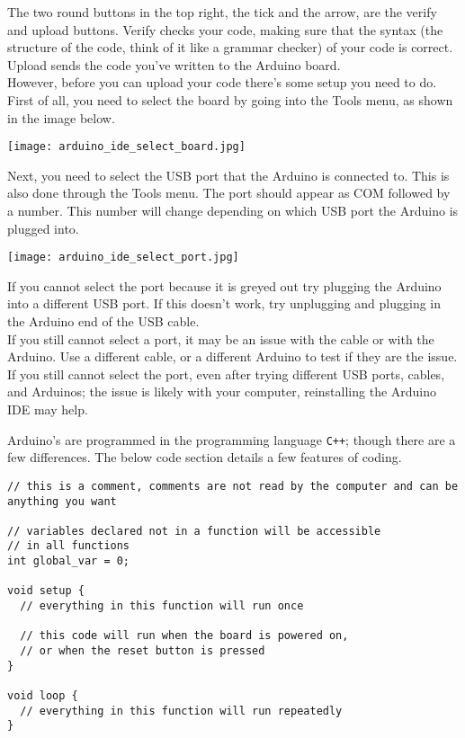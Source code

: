 \documentclass[../TinyBot.tex]{subfiles}
\begin{document}
The two round buttons in the top right, the tick and the arrow, are the verify and upload buttons. Verify checks your code, making sure that the syntax (the structure of the code, think of it like a grammar checker) of your code is correct. Upload sends the code you've written to the Arduino board.  \\

However, before you can upload your code there's some setup you need to do. First of all, you need to select the board by going into the Tools menu, as shown in the image below. 

\begin{center}
  \texttt{[image: arduino\_ide\_select\_board.jpg]}
\end{center}

Next, you need to select the USB port that the Arduino is connected to. This is also done through the Tools menu. The port should appear as COM followed by a number. This number will change depending on which USB port the Arduino is plugged into. 

\begin{center}
  \texttt{[image: arduino\_ide\_select\_port.jpg]}
\end{center}

\begin{notebox}
  If you cannot select the port because it is greyed out try plugging the Arduino into a different USB port. If this doesn't work, try unplugging and plugging in the Arduino end of the USB cable. \\

  If you still cannot select a port, it may be an issue with the cable or with the Arduino. Use a different cable, or a different Arduino to test if they are the issue. \\

  If you still cannot select the port, even after trying different USB ports, cables, and Arduinos; the issue is likely with your computer, reinstalling the Arduino IDE may help. 
  
\end{notebox}


\bigskip

Arduino's are programmed in the programming language \lstinline[]!C++!; though there are a few differences. The below code section details a few features of coding.


\begin{lstlisting}
// this is a comment, comments are not read by the computer and can be anything you want

// variables declared not in a function will be accessible
// in all functions
int global_var = 0;

void setup {
  // everything in this function will run once

  // this code will run when the board is powered on,
  // or when the reset button is pressed
}

void loop {
  // everything in this function will run repeatedly
}

\end{lstlisting}
\bigskip
\end{document}
